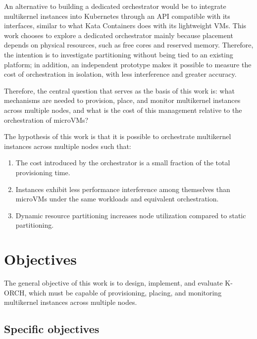 \documentclass[12pt]{article}
\begin{document}
An alternative to building a dedicated orchestrator would be to integrate multikernel instances into Kubernetes through
an API compatible with its interfaces, similar to what Kata Containers does with its lightweight VMs.
This work chooses to explore a dedicated orchestrator mainly because placement depends on physical resources, such as free cores and
reserved memory.
Therefore, the intention is to investigate partitioning without being tied to an existing platform; in addition, an independent prototype makes it possible
to measure the cost of orchestration in isolation, with less interference and greater accuracy.

Therefore, the central question that serves as the basis of this work is: what mechanisms are needed to provision, place, and monitor multikernel instances
across multiple nodes, and what is the cost of this management relative to the orchestration of microVMs?

The hypothesis of this work is that it is possible to orchestrate multikernel instances across multiple nodes such
that:

\begin{enumerate}
  \item The cost introduced by the orchestrator is a small fraction of the total provisioning time.
  \item Instances exhibit less performance interference among themselves than microVMs under the same workloads and equivalent orchestration.
  \item Dynamic resource partitioning increases node utilization compared to static partitioning.
\end{enumerate}

\section{Objectives} \label{sec:objetivos}

The general objective of this work is to design, implement, and evaluate K-ORCH, which must be capable of provisioning,
placing, and monitoring multikernel instances across multiple nodes.

\subsection{Specific objectives}\label{subsec:objetivo-especificos}
\end{document}
